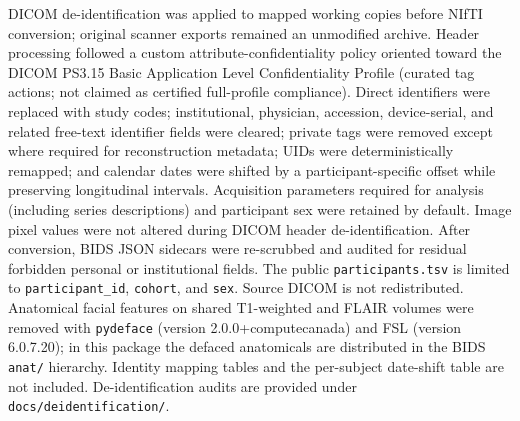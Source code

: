 DICOM de-identification was applied to mapped working copies before NIfTI conversion; original scanner exports remained an unmodified archive. Header processing followed a custom attribute-confidentiality policy oriented toward the DICOM PS3.15 Basic Application Level Confidentiality Profile (curated tag actions; not claimed as certified full-profile compliance). Direct identifiers were replaced with study codes; institutional, physician, accession, device-serial, and related free-text identifier fields were cleared; private tags were removed except where required for reconstruction metadata; UIDs were deterministically remapped; and calendar dates were shifted by a participant-specific offset while preserving longitudinal intervals. Acquisition parameters required for analysis (including series descriptions) and participant sex were retained by default. Image pixel values were not altered during DICOM header de-identification. After conversion, BIDS JSON sidecars were re-scrubbed and audited for residual forbidden personal or institutional fields. The public \texttt{participants.tsv} is limited to \texttt{participant\_id}, \texttt{cohort}, and \texttt{sex}. Source DICOM is not redistributed. Anatomical facial features on shared T1-weighted and FLAIR volumes were removed with \texttt{pydeface} (version 2.0.0+computecanada) and FSL (version 6.0.7.20); in this package the defaced anatomicals are distributed in the BIDS \texttt{anat/} hierarchy. Identity mapping tables and the per-subject date-shift table are not included. De-identification audits are provided under \texttt{docs/deidentification/}.
